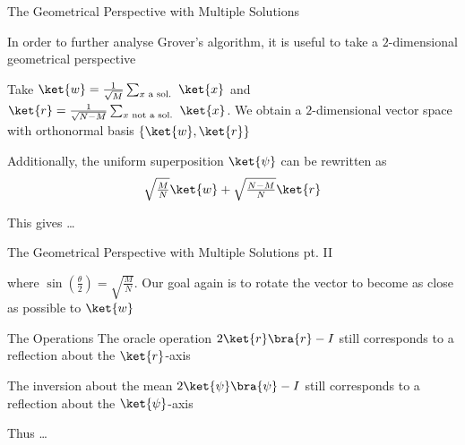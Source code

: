 \documentclass{beamer}
\begin{document}
\begin{frame}{The Geometrical Perspective with Multiple Solutions}

        In order to further analyse Grover's algorithm, it is useful to take a
        \alert{$2$-dimensional geometrical} perspective
        
        \pause
        Take $\ket{w} = \frac{1}{\sqrt{M}} \sum_{x \text{ a sol. }} \ket{x}$
        and $\ket{r} =
        \frac{1}{\sqrt{N-M}} \sum_{x \text{ not a sol. }} \ket{x}$. We obtain a
        $2$-dimensional vector space with orthonormal basis
        $\{\ket{w},\ket{r}\}$

        \pause
        Additionally, the uniform superposition $\ket{\psi}$ can be rewritten
        as
        \[
                \textstyle{
                        \sqrt{\frac{M}{N}} \ket{w} + \sqrt{\frac{N-M}{N}} \ket{r}
        }
        \]

        \pause
        This gives \dots
\end{frame}

\begin{frame}{The Geometrical Perspective with Multiple Solutions pt. II}

        \begin{center}
        \end{center}

        where $\sin(\frac{\theta}{2}) = \sqrt{\frac{M}{N}}$. Our goal again is
        to rotate the vector to become \alert{as close as possible} to
        $\ket{w}$

\end{frame}

\begin{frame}{The Operations}
        The oracle operation $2\ket{r}\bra{r} - I$ still corresponds to a
        reflection about the $\ket{r}$-axis

        The inversion about the mean $2\ket{\psi}\bra{\psi} - I$ still
        corresponds to a reflection about the $\ket{\psi}$-axis


        Thus \dots
\end{frame}
\end{document}
